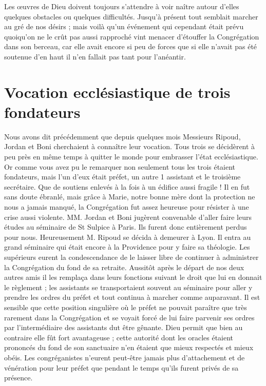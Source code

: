 Les œuvres de Dieu doivent toujours s'attendre à voir naître autour d'elles quelques obstacles ou quelques difficultés. Jusqu'à présent tout semblait marcher au gré de nos désirs ; mais voilà qu'un événement qui cependant était prévu quoiqu'on ne le crût pas aussi rapproché vint
menacer d'étouffer la Congrégation dans son berceau, car elle avait encore si peu de forces que si elle n'avait pas été soutenue d'en haut il n'en fallait pas tant pour l'anéantir.

\section*{Vocation ecclésiastique de trois fondateurs}
Nous avons dit précédemment que depuis quelques mois Messieurs Ripoud, Jordan et Boni cherchaient à connaître leur vocation. Tous trois se décidèrent à peu près en même temps à quitter le monde pour embrasser l'état ecclésiastique. Or comme vous avez pu le remarquer non seulement tous les trois étaient fondateurs, mais l'un d'eux était préfet, un autre 1 assistant et le troisième secrétaire. Que de soutiens enlevés à la fois à un édifice aussi fragile ! Il en fut sans doute ébranlé, mais grâce à Marie, notre bonne mère dont la protection ne nous a jamais manqué, la Congrégation fut assez heureuse pour résister à une crise aussi violente. MM. Jordan et Boni jugèrent convenable d'aller faire leurs études au séminaire de St Sulpice à Paris. Ils furent donc entièrement perdus pour nous. Heureusement M. Ripoud se décida à demeurer à Lyon. Il entra au grand séminaire qui était encore à la Providence pour y faire sa théologie. Les supérieurs eurent la condescendance de le laisser libre de continuer à administrer la Congrégation du fond de sa retraite. Aussitôt après le départ de nos deux autres amis il les remplaça dans leurs fonctions suivant le droit que lui en donnait le règlement ; les assistants se transportaient souvent au séminaire pour aller y prendre les ordres du préfet et tout continua à marcher comme auparavant. Il est sensible que
cette position singulière où le préfet ne pouvait paraître que très rarement dans la Congrégation et se voyait forcé de lui faire parvenir ses ordres par l'intermédiaire des assistants dut être gênante. Dieu permit que bien au contraire elle fût fort avantageuse ; cette autorité dont les oracles étaient prononcés du fond de son sanctuaire n'en étaient que mieux respectés et mieux obéis. Les congréganistes n'eurent peut-être jamais plus d'attachement et de vénération pour leur préfet que pendant le temps qu'ils furent privés de sa présence.

